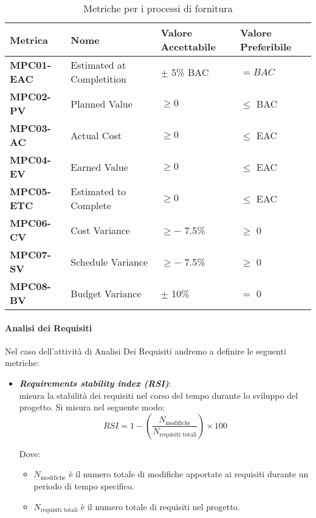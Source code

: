 \begin{table}[htbp]
    \centering
    \begin{tabular}{|>{\centering\arraybackslash}p{3cm}|p{5cm}|p{4cm}|p{4cm}|}
    \hline
    \rowcolor{gray!30}
    \textbf{Metrica} & \textbf{Nome} & \textbf{Valore Accettabile} & \textbf{Valore Preferibile} \\
    \hline
    \rowcolor{gray!10}
    \textbf{MPC01-EAC} & Estimated at Completition & $\pm$ 5\% BAC & $=BAC$ \\
    \hline
    \rowcolor{gray!10}
    \textbf{MPC02-PV} & Planned Value & $\geq 0$ & $\leq$ BAC \\
    \hline
    \rowcolor{gray!10}
    \textbf{MPC03-AC} & Actual Cost & $\geq 0$ & $\leq$ EAC \\
    \hline
    \rowcolor{gray!10}
    \textbf{MPC04-EV} & Earned Value & $\geq 0$ & $\leq$ EAC \\
    \hline
    \rowcolor{gray!10}
    \textbf{MPC05-ETC} & Estimated to Complete & $\geq 0$ & $\leq$ EAC \\
    \hline
    \rowcolor{gray!10}
    \textbf{MPC06-CV} & Cost Variance & $\geq -$ 7.5\% & $\geq$ 0 \\
    \hline
    \rowcolor{gray!10}
    \textbf{MPC07-SV} & Schedule Variance & $\geq -$ 7.5\% & $\geq$ 0 \\
    \hline
    \rowcolor{gray!10}
    \textbf{MPC08-BV} & Budget Variance & $\pm$ 10\% & $=$ 0 \\
    \hline
    \end{tabular}
    \caption{Metriche per i processi di fornitura}
    \label{tab:metriche_fornitura}
\end{table}


\paragraph{Analisi dei Requisiti}
Nel caso dell'attività di Analisi Dei Requisiti andremo a definire le seguenti metriche:
\begin{itemize}
    \item \textbf{\emph{Requirements stability index (RSI)}}:\\
    misura la stabilità dei requisiti nel corso del tempo durante lo sviluppo del progetto. Si misura nel seguente modo:
    \[
    RSI = 1 - \left( \frac{N_{\text{modifiche}}}{N_{\text{requisiti totali}}} \right) \times 100
    \]

    Dove:
    \begin{itemize}
        \item \(N_{\text{modifiche}}\) è il numero totale di modifiche apportate ai requisiti durante un periodo di tempo specifico.
        \item \(N_{\text{requisiti totali}}\) è il numero totale di requisiti nel progetto.
    \end{itemize}
\end{itemize}
